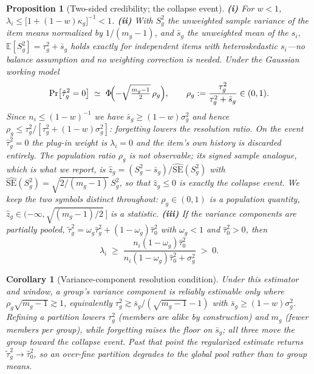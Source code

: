 \documentclass[twocolumn,10pt]{article}
\newtheorem{proposition}{Proposition}
\newtheorem{corollary}{Corollary}
\begin{document}
\begin{proposition}[Two-sided credibility; the collapse event]
\label{prop:twosided}
\textbf{(i)} For $w<1$,
$\lambda_i\le\bigl[1+(1-w)\kappa_g\bigr]^{-1}<1$.
\textbf{(ii)} With $S_g^2$ the unweighted sample variance of the item
means normalized by $1/(m_g-1)$, and $\bar s_g$ the unweighted mean of the
$s_i$, $\mathbb{E}[S_g^2]=\tau_g^2+\bar s_g$ holds \emph{exactly} for
independent items with heteroskedastic $s_i$---no balance assumption and
no weighting correction is needed. Under the Gaussian working model
\[
\Pr\bigl[\hat\tau_g^2=0\bigr]\;\simeq\;
\Phi\!\Bigl(-\sqrt{\tfrac{m_g-1}{2}}\,\rho_g\Bigr),
\qquad
\rho_g:=\frac{\tau_g^2}{\tau_g^2+\bar s_g}\in(0,1).
\]
Since $n_i\le(1-w)^{-1}$ we have $\bar s_g\ge(1-w)\sigma_g^2$ and hence
$\rho_g\le\tau_g^2/[\tau_g^2+(1-w)\sigma_g^2]$: \emph{forgetting lowers
the resolution ratio}. On the event $\hat\tau_g^2=0$ the plug-in weight is
$\lambda_i=0$ and the item's own history is discarded entirely.
The population ratio $\rho_g$ is not observable; its signed sample
analogue, which is what we report, is
$\hat z_g=(S_g^2-\bar s_g)/\widehat{\mathrm{SE}}(S_g^2)$ with
$\widehat{\mathrm{SE}}(S_g^2)=\sqrt{2/(m_g-1)}\,S_g^2$, so that
$\hat z_g\le0$ is exactly the collapse event. We keep the two symbols
distinct throughout: $\rho_g\in(0,1)$ is a population quantity,
$\hat z_g\in(-\infty,\sqrt{(m_g-1)/2}\,]$ is a statistic.
\textbf{(iii)} If the variance components are partially pooled,
$\tilde\tau_g^2=\omega_g\hat\tau_g^2+(1-\omega_g)\hat\tau_0^2$ with
$\omega_g<1$ and $\hat\tau_0^2>0$, then
\[
\lambda_i\;\ge\;
\frac{n_i(1-\omega_g)\hat\tau_0^2}
     {n_i(1-\omega_g)\hat\tau_0^2+\sigma_g^2}\;>\;0 .
\]
\end{proposition}

\begin{corollary}[Variance-component resolution condition]
\label{cor:resolution}
Under this estimator and window, a group's variance component is
reliably estimable only where $\rho_g\sqrt{m_g-1}\gtrsim1$, equivalently
$\tau_g^2\gtrsim\bar s_g/(\sqrt{m_g-1}-1)$ with
$\bar s_g\ge(1-w)\sigma_g^2$. Refining a partition lowers $\tau_g^2$
(members are alike by construction) and $m_g$ (fewer members per group),
while forgetting raises the floor on $\bar s_g$; all three move the group
toward the collapse event. Past that point the regularized estimate
returns $\tilde\tau_g^2\to\hat\tau_0^2$, so an over-fine partition
degrades to the \emph{global pool} rather than to group means.
\end{corollary}
\end{document}
